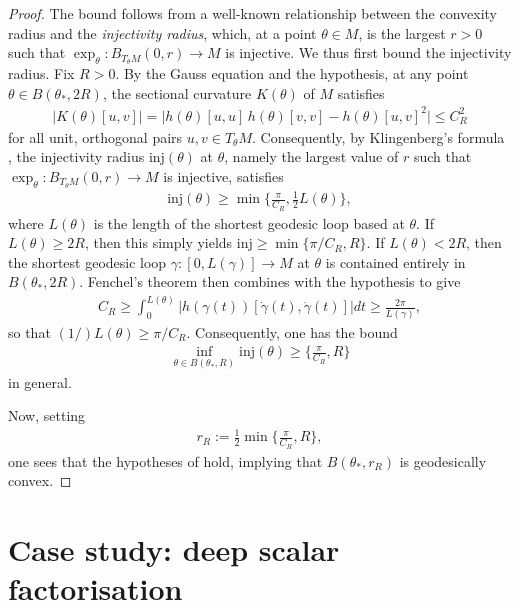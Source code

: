 \documentclass{article}
\theoremstyle{plain}
\theoremstyle{definition}
\theoremstyle{remark}
\begin{document}
\begin{proof}
    The bound follows from a well-known relationship between the convexity radius and the \emph{injectivity radius}, which, at a point $\theta\in M$, is the largest $r>0$ such that $\exp_{\theta}:B_{T_{\theta}M}(0,r)\rightarrow M$ is injective. We thus first bound the injectivity radius. Fix $R>0$. By the Gauss equation and the hypothesis, at any point $\theta\in B(\theta_*,2R)$, the sectional curvature $K(\theta)$ of $M$ satisfies
    \begin{align}
        |K(\theta)[u,v]| = \big|h(\theta)[u,u]\,h(\theta)[v,v] - h(\theta)[u,v]^2\big|\leq C_R^2
    \end{align}
    for all unit, orthogonal pairs $u,v\in T_{\theta}M$. Consequently, by Klingenberg's formula \cite[Lemma 6.4.7]{petersen}, the injectivity radius $\text{inj}(\theta)$ at $\theta$, namely the largest value of $r$ such that $\exp_{\theta}:B_{T_{\theta}M}(0,r)\rightarrow M$ is injective, satisfies
    \begin{align}
        \text{inj}(\theta)\geq\min\bigg\{\frac{\pi}{C_R},\frac{1}{2}L(\theta)\bigg\},
    \end{align}
    where $L(\theta)$ is the length of the shortest geodesic loop based at $\theta$. If $L(\theta)\geq 2R$, then this simply yields $\text{inj}\geq\min\{\pi/C_R,R\}$. If $L(\theta)<2R$, then the shortest geodesic loop $\gamma:[0,L(\gamma)]\rightarrow M$ at $\theta$ is contained entirely in $B(\theta_*,2R)$. Fenchel's theorem then combines with the hypothesis to give
    \begin{align}
        C_R\geq \int_0^{L(\theta)}\big|h(\gamma(t))[\dot{\gamma}(t),\dot{\gamma}(t)]\big|dt\geq \frac{2\pi}{L(\gamma)},
    \end{align}
    so that $(1/)L(\theta)\geq \pi/C_R$. Consequently, one has the bound
    \begin{align}
        \inf_{\theta\in B(\theta_*,R)}\text{inj}(\theta)\geq\bigg\{\frac{\pi}{C_R},R\bigg\}
    \end{align}
    in general.

    Now, setting
    \begin{align}
        r_R:=\frac{1}{2}\min\bigg\{\frac{\pi}{C_R},R\bigg\},
    \end{align}
    one sees that the hypotheses of \cite[Theorem 6.4.8]{petersen} hold, implying that $B(\theta_*,r_R)$ is geodesically convex.
\end{proof}

\section{Case study: deep scalar factorisation}
\end{document}
